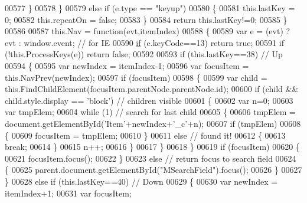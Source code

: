 \begin{DoxyCode}
00577         \}
00578       \}
00579       \textcolor{keywordflow}{else} \textcolor{keywordflow}{if} (e.type == \textcolor{stringliteral}{"keyup"})
00580       \{
00581         this.lastKey = 0;
00582         this.repeatOn = \textcolor{keyword}{false};
00583       \}
00584       \textcolor{keywordflow}{return} this.lastKey!=0;
00585     \}
00586 
00587     this.Nav = \textcolor{keyword}{function}(evt,itemIndex)
00588     \{
00589       var e  = (evt) ? evt : window.event; \textcolor{comment}{// for IE}
00590       \hyperlink{jquery_8js_a9db6d45a025ad692282fe23e69eeba43}{if} (e.keyCode==13) \textcolor{keywordflow}{return} \textcolor{keyword}{true};
00591       \textcolor{keywordflow}{if} (!this.ProcessKeys(e)) \textcolor{keywordflow}{return} \textcolor{keyword}{false};
00592 
00593       \textcolor{keywordflow}{if} (this.lastKey==38) \textcolor{comment}{// Up}
00594       \{
00595         var newIndex = itemIndex-1;
00596         var focusItem = this.NavPrev(newIndex);
00597         \textcolor{keywordflow}{if} (focusItem)
00598         \{
00599           var child = this.FindChildElement(focusItem.parentNode.parentNode.id);
00600           \textcolor{keywordflow}{if} (child && child.style.display == \textcolor{stringliteral}{'block'}) \textcolor{comment}{// children visible}
00601           \{
00602             var n=0;
00603             var tmpElem;
00604             \textcolor{keywordflow}{while} (1) \textcolor{comment}{// search for last child}
00605             \{
00606               tmpElem = document.getElementById(\textcolor{stringliteral}{'Item'}+newIndex+\textcolor{stringliteral}{'\_c'}+n);
00607               \textcolor{keywordflow}{if} (tmpElem)
00608               \{
00609                 focusItem = tmpElem;
00610               \}
00611               \textcolor{keywordflow}{else} \textcolor{comment}{// found it!}
00612               \{
00613                 \textcolor{keywordflow}{break};
00614               \}
00615               n++;
00616             \}
00617           \}
00618         \}
00619         \textcolor{keywordflow}{if} (focusItem)
00620         \{
00621           focusItem.focus();
00622         \}
00623         \textcolor{keywordflow}{else} \textcolor{comment}{// return focus to search field}
00624         \{
00625            parent.document.getElementById(\textcolor{stringliteral}{"MSearchField"}).focus();
00626         \}
00627       \}
00628       \textcolor{keywordflow}{else} \textcolor{keywordflow}{if} (this.lastKey==40) \textcolor{comment}{// Down}
00629       \{
00630         var newIndex = itemIndex+1;
00631         var focusItem;

\end{DoxyCode}
